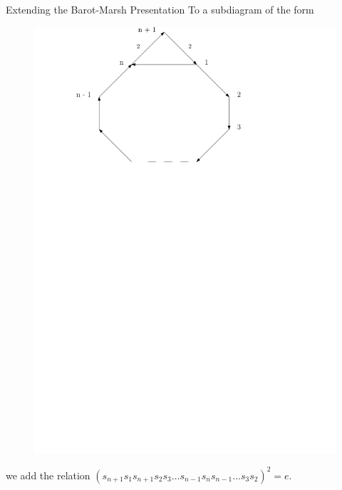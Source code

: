 \documentclass{beamer}
\begin{document}
\begin{frame}{Extending the Barot-Marsh Presentation}
To a subdiagram of the form
\begin{figure}
\includegraphics[scale = .50]{Diagram4.pdf}
\end{figure}
we add the relation $(s_{n+1}s_{1}s_{n+1}s_{2}s_{3} \dots s_{n-1}s_{n}s_{n-1} \dots s_{3}s_{2})^{2} = e$.
\end{frame}
\end{document}
